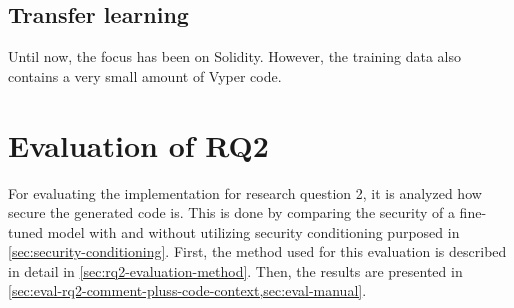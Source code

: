 \subsection{Transfer learning}
Until now, the focus has been on Solidity. However, the training data also contains a very small amount of Vyper code. 


%
%
%

\FloatBarrier

\section{Evaluation of RQ2}
\label{sec:rq2-evaluation}
For evaluating the implementation for research question 2, it is analyzed how secure the generated code is. This is done by comparing the security of a fine-tuned model with and without utilizing security conditioning purposed in \cref{sec:security-conditioning}. First, the method used for this evaluation is described in detail in \cref{sec:rq2-evaluation-method}. Then, the results are presented in \cref{sec:eval-rq2-comment-pluss-code-context,sec:eval-manual}.

